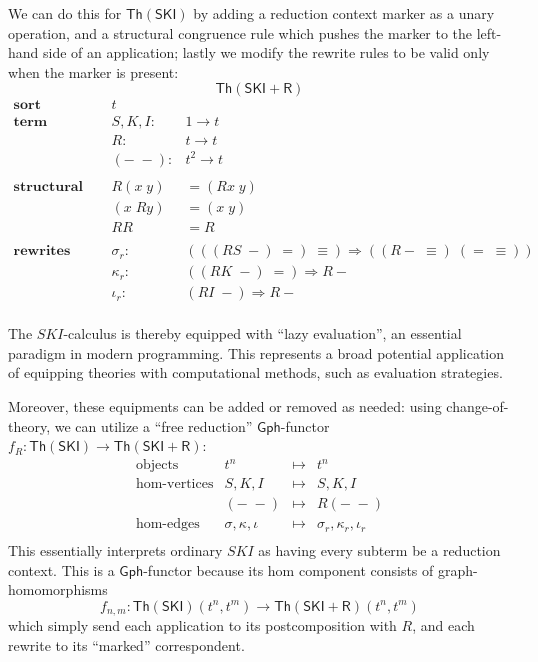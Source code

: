 \documentclass{amsart}
\theoremstyle{definition}
\newcommand{\Th}{\mathsf{Th}}
\newcommand{\Gph}{\mathsf{Gph}}
\newcommand{\maps}{\colon}
\begin{document}
We can do this for $\Th(\mathsf{SKI})$ by adding a reduction context marker as a unary operation, and a structural congruence rule which pushes the marker to the left-hand side of an application; lastly we modify the rewrite rules to be valid only when the marker is present:
$$\Th(\mathsf{SKI}+\mathsf{R})$$
\[\begin{array}{lrl}
\textbf{sort} & t &\\
\textbf{term constructors} & S,K,I \maps &1 \to t\\
& R\maps & t \to t\\
& (-\; -)\maps & t^2 \to t\\\\
    \textbf{structural congruence} & R(x\; y) & = (Rx\; y) \\
    & (x\; Ry) & = (x\; y) \\
& RR & = R\\\\
\textbf{rewrites} & \sigma_r\maps & (((RS\; -)\; =)\; \equiv) \Rightarrow ((R-\; \equiv)\; (=\; \equiv))\\
& \kappa_r\maps & ((RK\; -)\; =) \Rightarrow R-\\
& \iota_r\maps & (RI\; -) \Rightarrow R-\\
\end{array}\]

The $SKI$-calculus is thereby equipped with ``lazy evaluation'', an essential paradigm in modern programming. This represents a broad potential application of equipping theories with computational methods, such as evaluation strategies.

Moreover, these equipments can be added or removed as needed: using change-of-theory, we can utilize a ``free reduction'' $\Gph$-functor $f_R\maps\Th(\mathsf{SKI})\to \Th(\mathsf{SKI}+\mathsf{R})$:
\[\begin{array}{rrcl}
\text{objects} & t^n & \mapsto & t^n\\
\text{hom-vertices} & S,K,I & \mapsto & S,K,I\\
& (-\; -) & \mapsto & R(-\; -)\\
\text{hom-edges} & \sigma, \kappa, \iota & \mapsto & \sigma_r, \kappa_r, \iota_r\\
\end{array}\]
This essentially interprets ordinary $SKI$ as having every subterm be a reduction context. This is a $\Gph$-functor because its hom component consists of graph-homomorphisms $$f_{n,m}\maps \Th(\mathsf{SKI})(t^n,t^m) \to \Th(\mathsf{SKI}+\mathsf{R})(t^n,t^m)$$ which simply send each application to its postcomposition with $R$, and each rewrite to its ``marked'' correspondent.
\end{document}
